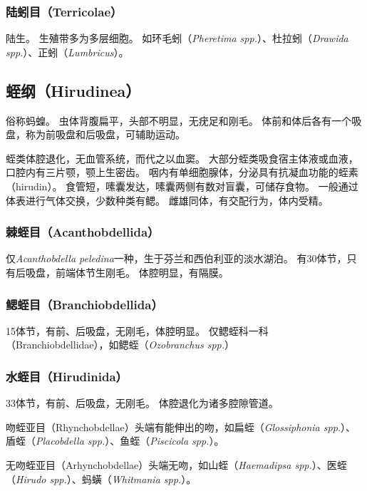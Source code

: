 \documentclass[11pt]{article}
\begin{document}
\subsubsection{陆蚓目（Terricolae）}
陆生。
生殖带多为多层细胞。
如环毛蚓（\textit{Pheretima spp.}）、杜拉蚓（\textit{Drawida spp.}）、正蚓（\textit{Lumbricus}）。

\subsection{蛭纲（Hirudinea）}
俗称蚂蝗。
虫体背腹扁平，头部不明显，无疣足和刚毛。
体前和体后各有一个吸盘，称为前吸盘和后吸盘，可辅助运动。

\newline

蛭类体腔退化，无血管系统，而代之以血窦。
大部分蛭类吸食宿主体液或血液，口腔内有三片颚，颚上生密齿。
咽内有单细胞腺体，分泌具有抗凝血功能的蛭素（hirudin）。
食管短，嗉囊发达，嗉囊两侧有数对盲囊，可储存食物。
一般通过体表进行气体交换，少数种类有鳃。
雌雄同体，有交配行为，体内受精。

\subsubsection{棘蛭目（Acanthobdellida）}
仅\textit{Acanthobdella peledina}一种，生于芬兰和西伯利亚的淡水湖泊。
有30体节，只有后吸盘，前端体节生刚毛。
体腔明显，有隔膜。

\subsubsection{鳃蛭目（Branchiobdellida）}
15体节，有前、后吸盘，无刚毛，体腔明显。
仅鳃蛭科一科（Branchiobdellidae），如鳃蛭（\textit{Ozobranchus spp.}）

\subsubsection{水蛭目（Hirudinida）}
33体节，有前、后吸盘，无刚毛。
体腔退化为诸多腔隙管道。

\newline

吻蛭亚目（Rhynchobdellae）头端有能伸出的吻，如扁蛭（\textit{Glossiphonia spp.}）、盾蛭（\textit{Placobdella spp.}）、鱼蛭（\textit{Piscicola spp.}）。

\newline

无吻蛭亚目（Arhynchobdellae）头端无吻，如山蛭（\textit{Haemadipsa spp.}）、医蛭（\textit{Hirudo spp.}）、蚂蟥（\textit{Whitmania spp.}）。
\end{document}
